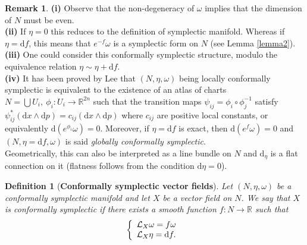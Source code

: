 \documentclass[11pt]{article}
\newtheorem{definition}[lemma]{Definition}
\theoremstyle{definition}
\newtheorem{remark}[lemma]{Remark}
\def\d{\mathrm{d}}
\begin{document}
\begin{remark}
{\bf (i)} Observe that the non-degeneracy of $\omega$ implies that the dimension of $N$ must be even.\\
{\bf (ii)} If $\eta=0$ this reduces to the definition of symplectic manifold. Whereas if $\eta= \d f$, this means that $e^{-f}\omega$ is a symplectic form on $N$ (see Lemma \ref{lemma2}).\\
{\bf (iii)} One could consider this conformally symplectic structure, modulo the equivalence relation $\eta \sim \eta + \d f$. \\
{\bf (iv)} 
 It has been proved by Lee \cite{Lee} that $(N,\eta,\omega)$ being locally conformally symplectic is equivalent to the existence of an atlas of charts $N=\bigcup U_i,\: \phi_i:U_i\rightarrow {\mathbb R}^{2n}$ such that the transition maps $\psi_{ij}=\phi_i\circ\phi_j^{-1}$ satisfy $\psi_{ij}^*(\d x\wedge \d p) = c_{ij}(\d x\wedge \d p)$ where $c_{ij}$ are positive local constants, or equivalently $\d(e^{\phi_i}\omega)=0$. Moreover, if $\eta =\d f$ is exact, then $\d(e^f\omega)=0$ and $(N,\eta=\d f,\omega)$ is said \emph{globally conformally symplectic}.\\
 
Geometrically, this can also be interpreted as a line bundle on $N$ and $\d_\eta$ is a flat connection on it (flatness follows from the condition $\d\eta=0$).\\
 \end{remark}
 
 \bigskip
 
 
 \begin{definition}[{\bf Conformally symplectic vector fields}]
Let $(N,\eta,\omega)$ be a conformally symplectic manifold and let $X$ be a vector field on $N$.
 We say that $X$ is {\it conformally symplectic} if there exists a smooth function $f: N\rightarrow{\mathbb R}$ such that
  \begin{equation} \label{eqcsgen}
\left\{  \begin{array}{l}
    {\mathcal L}_X\omega = f \omega \\
    {\mathcal L}_X\eta = \d f.
    \end{array}\right.\\
  \end{equation}
  \end{definition}

\medskip
\end{document}
